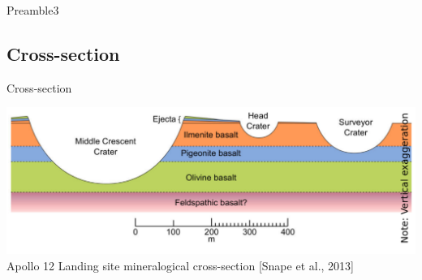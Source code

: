 \documentclass[aspectratio=169,unknownkeysallowed,xcolor=dvipsnames,beamer]{beamer} %
\begin{document}
\begin{frame}[fragile]{Preamble3}
\subsection{Cross-section}
\begin{block}{Cross-section}
\begin{center}
  \includegraphics[width=14cm]{images/fig2}\\
  Apollo 12 Landing site mineralogical cross-section [Snape et al., 2013]
\end{center}
\end{block}
\end{frame}
\end{document}
